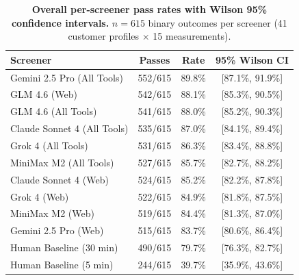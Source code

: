 \documentclass[12pt]{article}
\begin{document}
\begin{table}[H]
\centering
\caption{\textbf{Overall per-screener pass rates with Wilson 95\% confidence intervals.} $n = 615$ binary outcomes per screener (41 customer profiles $\times$ 15 measurements).}
\label{tab:wilson_overall}
\small
\begin{tabular}{lccc}
\toprule
\textbf{Screener} & \textbf{Passes} & \textbf{Rate} & \textbf{95\% Wilson CI} \\
\midrule
Gemini 2.5 Pro (All Tools) & 552/615 & 89.8\% & [87.1\%, 91.9\%] \\
GLM 4.6 (Web)              & 542/615 & 88.1\% & [85.3\%, 90.5\%] \\
GLM 4.6 (All Tools)        & 541/615 & 88.0\% & [85.2\%, 90.3\%] \\
Claude Sonnet 4 (All Tools)& 535/615 & 87.0\% & [84.1\%, 89.4\%] \\
Grok 4 (All Tools)         & 531/615 & 86.3\% & [83.4\%, 88.8\%] \\
MiniMax M2 (All Tools)     & 527/615 & 85.7\% & [82.7\%, 88.2\%] \\
Claude Sonnet 4 (Web)      & 524/615 & 85.2\% & [82.2\%, 87.8\%] \\
Grok 4 (Web)               & 522/615 & 84.9\% & [81.8\%, 87.5\%] \\
MiniMax M2 (Web)           & 519/615 & 84.4\% & [81.3\%, 87.0\%] \\
Gemini 2.5 Pro (Web)       & 515/615 & 83.7\% & [80.6\%, 86.4\%] \\
Human Baseline (30 min)    & 490/615 & 79.7\% & [76.3\%, 82.7\%] \\
Human Baseline (5 min)     & 244/615 & 39.7\% & [35.9\%, 43.6\%] \\
\bottomrule
\end{tabular}
\end{table}
\end{document}
